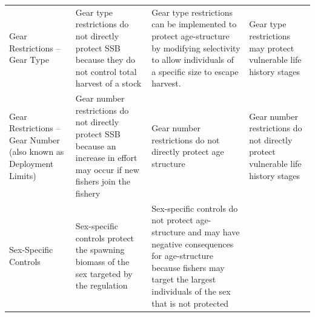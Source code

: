 \documentclass[]{book}
\begin{document}
\begin{longtable}[]{@{}llll@{}}
\begin{minipage}[t]{0.22\columnwidth}
Gear Restrictions -- Gear Type\strut
\end{minipage} & \begin{minipage}[t]{0.22\columnwidth}\raggedright\strut
Gear type restrictions do not directly protect SSB because they do not
control total harvest of a stock\strut
\end{minipage} & \begin{minipage}[t]{0.22\columnwidth}\raggedright\strut
Gear type restrictions can be implemented to protect age-structure by
modifying selectivity to allow individuals of a specific size to escape
harvest.\strut
\end{minipage} & \begin{minipage}[t]{0.22\columnwidth}\raggedright\strut
Gear type restrictions may protect vulnerable life history stages\strut
\end{minipage}\tabularnewline
\begin{minipage}[t]{0.22\columnwidth}\raggedright\strut
Gear Restrictions -- Gear Number (also known as Deployment Limits)\strut
\end{minipage} & \begin{minipage}[t]{0.22\columnwidth}\raggedright\strut
Gear number restrictions do not directly protect SSB because an increase
in effort may occur if new fishers join the fishery\strut
\end{minipage} & \begin{minipage}[t]{0.22\columnwidth}\raggedright\strut
Gear number restrictions do not directly protect age structure\strut
\end{minipage} & \begin{minipage}[t]{0.22\columnwidth}\raggedright\strut
Gear number restrictions do not directly protect vulnerable life history
stages\strut
\end{minipage}\tabularnewline
\begin{minipage}[t]{0.22\columnwidth}\raggedright\strut
Sex-Specific Controls\strut
\end{minipage} & \begin{minipage}[t]{0.22\columnwidth}\raggedright\strut
Sex-specific controls protect the spawning biomass of the sex targeted
by the regulation\strut
\end{minipage} & \begin{minipage}[t]{0.22\columnwidth}\raggedright\strut
Sex-specific controls do not protect age-structure and may have negative
consequences for age-structure because fishers may target the largest
individuals of the sex that is not protected\strut

\end{minipage}
\end{longtable}
\end{document}
